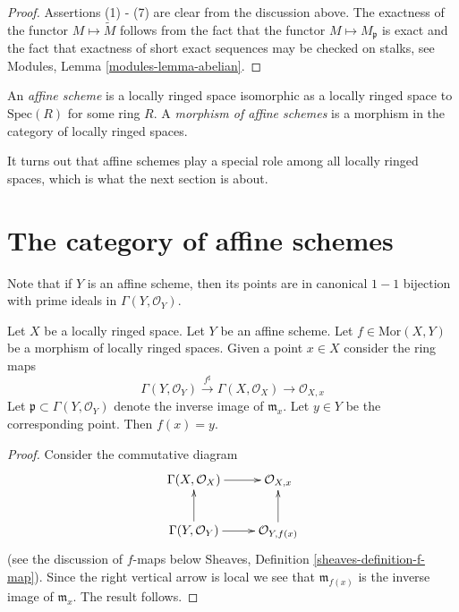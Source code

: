 \begin{proof}
Assertions (1) - (7) are clear from the discussion above.
The exactness of the functor $M \mapsto \widetilde M$
follows from the fact that the functor $M \mapsto M_{\mathfrak p}$
is exact and the fact that exactness of short exact sequences
may be checked on stalks, see
Modules, Lemma \ref{modules-lemma-abelian}.
\end{proof}

\begin{definition}
\label{definition-affine-scheme}
An {\it affine scheme} is a locally ringed space isomorphic
as a locally ringed space to $\text{Spec}(R)$ for some ring $R$.
A {\it morphism of affine schemes} is a morphism in the category
of locally ringed spaces.
\end{definition}

\noindent
It turns out that affine schemes play a special role
among all locally ringed spaces, which is what the next
section is about.


















\section{The category of affine schemes}
\label{section-category-affine-schemes}

\noindent
Note that if $Y$ is an affine scheme, then its
points are in canonical $1-1$ bijection with
prime ideals in $\Gamma(Y, \mathcal{O}_Y)$.

\begin{lemma}
\label{lemma-morphism-into-affine-where-point-goes}
Let $X$ be a locally ringed space.
Let $Y$ be an affine scheme.
Let $f \in \text{Mor}(X, Y)$ be a morphism
of locally ringed spaces. Given a point $x \in X$
consider the ring maps
$$
\Gamma(Y, \mathcal{O}_Y) \xrightarrow{f^\sharp}
\Gamma(X, \mathcal{O}_X) \to \mathcal{O}_{X, x}
$$
Let $\mathfrak p \subset \Gamma(Y, \mathcal{O}_Y)$ denote
the inverse image of $\mathfrak m_x$. Let $y \in Y$ be the
corresponding point. Then $f(x) = y$.
\end{lemma}

\begin{proof}
Consider the commutative diagram
$$
\xymatrix{
\Gamma(X, \mathcal{O}_X) \ar[r] &
\mathcal{O}_{X, x} \\
\Gamma(Y, \mathcal{O}_Y) \ar[r] \ar[u] &
\mathcal{O}_{Y, f(x)} \ar[u]
}
$$
(see the discussion of $f$-maps below
Sheaves, Definition \ref{sheaves-definition-f-map}).
Since the right vertical arrow is local
we see that $\mathfrak m_{f(x)}$ is the
inverse image of $\mathfrak m_x$. The result
follows.
\end{proof}

